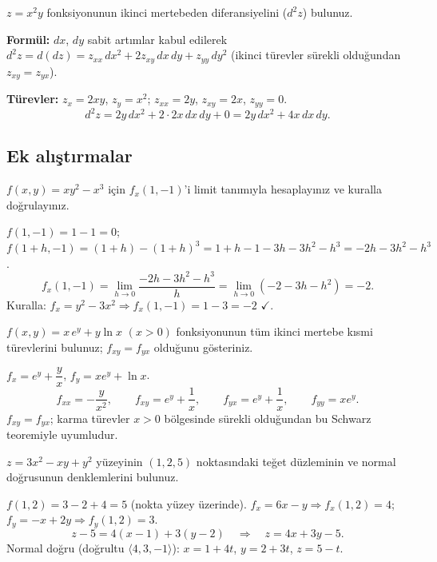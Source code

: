 \begin{soru}
$z=x^2y$ fonksiyonunun ikinci mertebeden diferansiyelini ($d^2z$) bulunuz.
\end{soru}
\begin{cevap}
\textbf{Formül:} $dx$, $dy$ sabit artımlar kabul edilerek $d^2z=d(dz)=z_{xx}\,dx^2+2z_{xy}\,dx\,dy+z_{yy}\,dy^2$
(ikinci türevler sürekli olduğundan $z_{xy}=z_{yx}$).

\textbf{Türevler:} $z_x=2xy$, $z_y=x^2$; $z_{xx}=2y$, $z_{xy}=2x$, $z_{yy}=0$.
\[ d^2z=2y\,dx^2+2\cdot2x\,dx\,dy+0=2y\,dx^2+4x\,dx\,dy . \]
\end{cevap}

\subsection{Ek alıştırmalar}

\begin{soru}
$f(x,y)=xy^2-x^3$ için $f_x(1,-1)$'i limit tanımıyla hesaplayınız ve kuralla doğrulayınız.
\end{soru}
\begin{cevap}
$f(1,-1)=1-1=0$; $f(1+h,-1)=(1+h)-(1+h)^3=1+h-1-3h-3h^2-h^3=-2h-3h^2-h^3$.
\[ f_x(1,-1)=\lim_{h\to0}\frac{-2h-3h^2-h^3}{h}=\lim_{h\to0}(-2-3h-h^2)=-2 . \]
Kuralla: $f_x=y^2-3x^2\Rightarrow f_x(1,-1)=1-3=-2$ $\checkmark$.
\end{cevap}

\begin{soru}
$f(x,y)=x\,e^{y}+y\ln x$ $(x>0)$ fonksiyonunun tüm ikinci mertebe kısmi türevlerini bulunuz; $f_{xy}=f_{yx}$
olduğunu gösteriniz.
\end{soru}
\begin{cevap}
$f_x=e^y+\dfrac yx$, \quad $f_y=xe^y+\ln x$.
\[
f_{xx}=-\frac{y}{x^2},\qquad f_{xy}=e^y+\frac1x,\qquad f_{yx}=e^y+\frac1x,\qquad f_{yy}=xe^y .
\]
$f_{xy}=f_{yx}$; karma türevler $x>0$ bölgesinde sürekli olduğundan bu Schwarz teoremiyle uyumludur.
\end{cevap}

\begin{soru}
$z=3x^2-xy+y^2$ yüzeyinin $(1,2,5)$ noktasındaki teğet düzleminin ve normal doğrusunun denklemlerini bulunuz.
\end{soru}
\begin{cevap}
$f(1,2)=3-2+4=5$ (nokta yüzey üzerinde). $f_x=6x-y\Rightarrow f_x(1,2)=4$; $f_y=-x+2y\Rightarrow f_y(1,2)=3$.
\[ z-5=4(x-1)+3(y-2)\quad\Longrightarrow\quad z=4x+3y-5 . \]
Normal doğru (doğrultu $\langle4,3,-1\rangle$): $x=1+4t$, $y=2+3t$, $z=5-t$.
\end{cevap}

